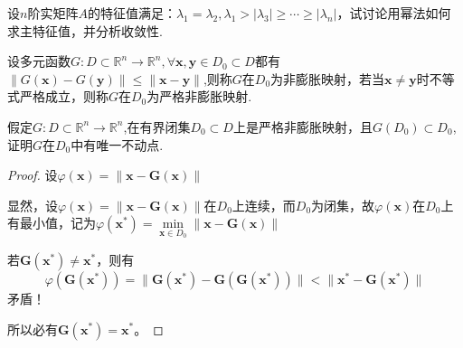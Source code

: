 \begin{example}
    设$n$阶实矩阵$A$的特征值满足：$\lambda_1=\lambda_2,\lambda_1>|\lambda_3|\geq\cdots\geq|\lambda_n|$，试讨论用幂法如何求主特征值，并分析收敛性.
\end{example}
\begin{example}
    设多元函数$G:D\subset\mathbb{R}^n\to\mathbb{R}^n,\forall \boldsymbol{x},\boldsymbol{y}\in D_0\subset D$都有$\|G(\boldsymbol{x})-G(\boldsymbol{y})\|\leq\|\boldsymbol{x}-\boldsymbol{y}\|$,则称$G$在$D_0$为非膨胀映射，若当$\boldsymbol{x}\neq \boldsymbol{y}$时不等式严格成立，则称$G$在$D_0$为严格非膨胀映射.

    假定$G{:}D\subset\mathbb{R}^n\to\mathbb{R}^n$,在有界闭集$D_0\subset D$上是严格非膨胀映射，且$G(D_0)\subset D_0$,证明$G$在$D_0$中有唯一不动点.
\end{example}
\begin{proof}
    设$\varphi(\boldsymbol{x}) = \|\boldsymbol{x}-\boldsymbol{G}(\boldsymbol{x})\|$
    
    显然，设$\varphi(\boldsymbol{x}) = \|\boldsymbol{x}-\boldsymbol{G}(\boldsymbol{x})\|$在$D_0$上连续，而$D_0$为闭集，故$\varphi(\boldsymbol{x})$在$D_0$上有最小值，记为$\varphi(\boldsymbol{x}^*) = \min\limits_{\boldsymbol{x}\in D_0}\|\boldsymbol{x}-\boldsymbol{G}(\boldsymbol{x})\|$

    若$\boldsymbol{G}(\boldsymbol{x}^*)\neq \boldsymbol{x}^*$，则有
    \[
        \varphi(\boldsymbol{G}(\boldsymbol{x}^*)) = \|\boldsymbol{G}(\boldsymbol{x}^*)-\boldsymbol{G}(\boldsymbol{G}(\boldsymbol{x}^*))\|<\|\boldsymbol{x}^*-\boldsymbol{G}(\boldsymbol{x}^*)\|
    \]矛盾！
    
    所以必有$\boldsymbol{G}(\boldsymbol{x}^*) = \boldsymbol{x}^*$。
\end{proof}